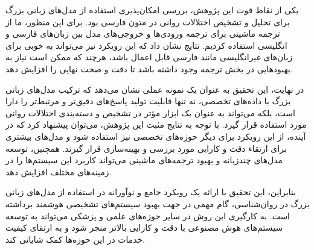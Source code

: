 \documentclass{CCI2020}
\begin{document}
یکی از نقاط قوت این پژوهش، بررسی امکان‌پذیری استفاده از مدل‌های زبانی بزرگ برای تحلیل و تشخیص اختلالات روانی در متون فارسی بود. برای این منظور، ما از ترجمه ماشینی برای ترجمه ورودی‌ها و خروجی‌های مدل بین زبان‌های فارسی و انگلیسی استفاده کردیم. نتایج نشان داد که این رویکرد نیز می‌تواند به خوبی برای زبان‌های غیرانگلیسی مانند فارسی قابل اعمال باشد، هرچند که ممکن است نیاز به بهبودهایی در بخش ترجمه وجود داشته باشد تا دقت و صحت نهایی را افزایش دهد.

در نهایت، این تحقیق به عنوان یک نمونه عملی نشان می‌دهد که ترکیب مدل‌های زبانی بزرگ با داده‌های تخصصی، نه تنها قابلیت تولید پاسخ‌های دقیق‌تر و مرتبط‌تر را دارا است، بلکه می‌تواند به عنوان یک ابزار مؤثر در تشخیص و دسته‌بندی اختلالات روانی مورد استفاده قرار گیرد. با توجه به نتایج مثبت این پژوهش، می‌توان پیشنهاد کرد که در آینده، از این رویکرد برای دیگر حوزه‌های تخصصی نیز استفاده شود و مدل‌های بیشتری برای ارتقاء دقت و کارایی مورد بررسی و بهینه‌سازی قرار گیرند. همچنین، توسعه مدل‌های چندزبانه و بهبود ترجمه‌های ماشینی می‌تواند کاربرد این سیستم‌ها را در زمینه‌های مختلف افزایش دهد.

بنابراین، این تحقیق با ارائه یک رویکرد جامع و نوآورانه در استفاده از مدل‌های زبانی بزرگ در روان‌شناسی، گام مهمی در جهت بهبود سیستم‌های تشخیصی هوشمند برداشته است. به کارگیری این روش در سایر حوزه‌های علمی و پزشکی می‌تواند به توسعه سیستم‌های هوش مصنوعی با دقت و کارایی بالاتر منجر شود و به ارتقای کیفیت خدمات در این حوزه‌ها کمک شایانی کند.


%


\end{document}
